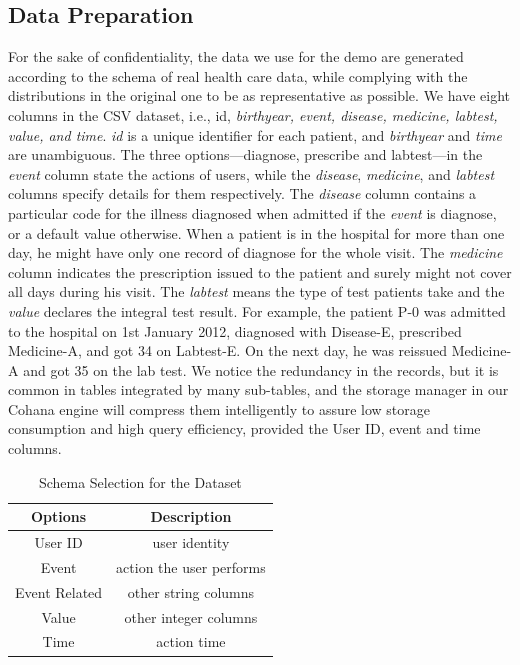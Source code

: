 \documentclass[10pt,conference,letterpaper]{IEEEtran}
\begin{document}
\subsection{Data Preparation}

For the sake of confidentiality, the data we use for the demo are generated according to the schema of real health care data, while complying with the distributions in the original one to be as representative as possible. We have eight columns in the CSV dataset, i.e., id, \emph{birthyear, event, disease, medicine, labtest, value, and time}. \emph{id} is a unique identifier for each patient, and \emph{birthyear} and \emph{time} are unambiguous. The three options---diagnose, prescribe and labtest---in the \emph{event} column state the actions of users, while the \emph{disease}, \emph{medicine}, and \emph{labtest} columns specify details for them respectively. The \emph{disease} column contains a particular code for the illness diagnosed when admitted if the \emph{event} is diagnose, or a default value otherwise. When a patient is in the hospital for more than one day, he might have only one record of diagnose for the whole visit. The \emph{medicine} column indicates the prescription issued to the patient and surely might not cover all days during his visit. The \emph{labtest} means the type of test patients take and the \emph{value} declares the integral test result. For example, the patient P-0 was admitted to the hospital on 1st January 2012, diagnosed with Disease-E, prescribed Medicine-A, and got 34 on Labtest-E. On the next day, he was reissued Medicine-A and got 35 on the lab test. We notice the redundancy in the records, but it is common in tables integrated by many sub-tables, and the storage manager in our Cohana engine will compress them intelligently to assure low storage consumption and high query efficiency, provided the User ID, event and time columns.

\begin{table}[h!]
\begin{center}
    \begin{tabular}{ |c|c| }
        \hline
        Options & Description \\[0.5ex] 
        \hline\hline
        User ID & user identity \\
        \hline
        Event & action the user performs\\
        \hline
        Event Related & other string columns\\
        \hline
        Value & other integer columns\\
        \hline
        Time & action time \\
        \hline
    \end{tabular}
\end{center}
\caption{Schema Selection for the Dataset}
\label{table:schema}
\end{table}
\end{document}
